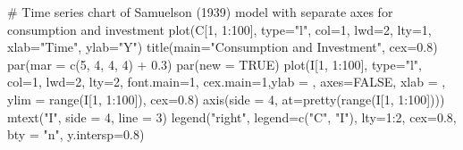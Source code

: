 \documentclass[
  letterpaper,
  DIV=11,
  numbers=noendperiod]{scrreprt}
\newenvironment{Shaded}{\begin{snugshade}}{\end{snugshade}}
\newcommand{\AttributeTok}[1]{\textcolor[rgb]{0.40,0.45,0.13}{#1}}
\newcommand{\CommentTok}[1]{\textcolor[rgb]{0.37,0.37,0.37}{#1}}
\newcommand{\ConstantTok}[1]{\textcolor[rgb]{0.56,0.35,0.01}{#1}}
\newcommand{\DecValTok}[1]{\textcolor[rgb]{0.68,0.00,0.00}{#1}}
\newcommand{\FloatTok}[1]{\textcolor[rgb]{0.68,0.00,0.00}{#1}}
\newcommand{\FunctionTok}[1]{\textcolor[rgb]{0.28,0.35,0.67}{#1}}
\newcommand{\NormalTok}[1]{\textcolor[rgb]{0.00,0.23,0.31}{#1}}
\newcommand{\SpecialCharTok}[1]{\textcolor[rgb]{0.37,0.37,0.37}{#1}}
\newcommand{\StringTok}[1]{\textcolor[rgb]{0.13,0.47,0.30}{#1}}
\begin{document}
\begin{Shaded}
\begin{Highlighting}[]
\CommentTok{\# Time series chart of Samuelson (1939) model with separate axes for consumption and investment}
\FunctionTok{plot}\NormalTok{(C[}\DecValTok{1}\NormalTok{, }\DecValTok{1}\SpecialCharTok{:}\DecValTok{100}\NormalTok{], }\AttributeTok{type=}\StringTok{"l"}\NormalTok{, }\AttributeTok{col=}\DecValTok{1}\NormalTok{, }\AttributeTok{lwd=}\DecValTok{2}\NormalTok{, }\AttributeTok{lty=}\DecValTok{1}\NormalTok{, }\AttributeTok{xlab=}\StringTok{"Time"}\NormalTok{, }\AttributeTok{ylab=}\StringTok{"Y"}\NormalTok{) }
\FunctionTok{title}\NormalTok{(}\AttributeTok{main=}\StringTok{"Consumption and Investment"}\NormalTok{, }\AttributeTok{cex=}\FloatTok{0.8}\NormalTok{)}
\FunctionTok{par}\NormalTok{(}\AttributeTok{mar =} \FunctionTok{c}\NormalTok{(}\DecValTok{5}\NormalTok{, }\DecValTok{4}\NormalTok{, }\DecValTok{4}\NormalTok{, }\DecValTok{4}\NormalTok{) }\SpecialCharTok{+} \FloatTok{0.3}\NormalTok{)}
\FunctionTok{par}\NormalTok{(}\AttributeTok{new =} \ConstantTok{TRUE}\NormalTok{)}
\FunctionTok{plot}\NormalTok{(I[}\DecValTok{1}\NormalTok{, }\DecValTok{1}\SpecialCharTok{:}\DecValTok{100}\NormalTok{], }\AttributeTok{type=}\StringTok{"l"}\NormalTok{, }\AttributeTok{col=}\DecValTok{1}\NormalTok{, }\AttributeTok{lwd=}\DecValTok{2}\NormalTok{, }\AttributeTok{lty=}\DecValTok{2}\NormalTok{, }\AttributeTok{font.main=}\DecValTok{1}\NormalTok{, }\AttributeTok{cex.main=}\DecValTok{1}\NormalTok{,}\AttributeTok{ylab =} \StringTok{\textquotesingle{}\textquotesingle{}}\NormalTok{, }\AttributeTok{axes=}\ConstantTok{FALSE}\NormalTok{,}
     \AttributeTok{xlab =} \StringTok{\textquotesingle{}\textquotesingle{}}\NormalTok{, }\AttributeTok{ylim =} \FunctionTok{range}\NormalTok{(I[}\DecValTok{1}\NormalTok{, }\DecValTok{1}\SpecialCharTok{:}\DecValTok{100}\NormalTok{]), }\AttributeTok{cex=}\FloatTok{0.8}\NormalTok{)}
\FunctionTok{axis}\NormalTok{(}\AttributeTok{side =} \DecValTok{4}\NormalTok{, }\AttributeTok{at=}\FunctionTok{pretty}\NormalTok{(}\FunctionTok{range}\NormalTok{(I[}\DecValTok{1}\NormalTok{, }\DecValTok{1}\SpecialCharTok{:}\DecValTok{100}\NormalTok{])))  }
\FunctionTok{mtext}\NormalTok{(}\StringTok{"I"}\NormalTok{, }\AttributeTok{side =} \DecValTok{4}\NormalTok{, }\AttributeTok{line =} \DecValTok{3}\NormalTok{)}
\FunctionTok{legend}\NormalTok{(}\StringTok{"right"}\NormalTok{, }\AttributeTok{legend=}\FunctionTok{c}\NormalTok{(}\StringTok{"C"}\NormalTok{, }\StringTok{"I"}\NormalTok{),}
       \AttributeTok{lty=}\DecValTok{1}\SpecialCharTok{:}\DecValTok{2}\NormalTok{, }\AttributeTok{cex=}\FloatTok{0.8}\NormalTok{, }\AttributeTok{bty =} \StringTok{"n"}\NormalTok{, }\AttributeTok{y.intersp=}\FloatTok{0.8}\NormalTok{)}
\end{Highlighting}
\end{Shaded}
\end{document}
